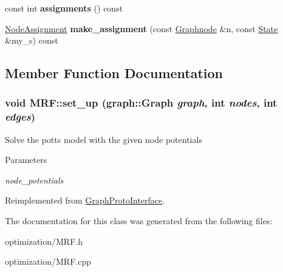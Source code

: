 \begin{DoxyCompactItemize}
\item 
\hypertarget{class_m_r_f_aaf17c4a671ea4f06553c33fca90bfa35}{
const int {\bfseries assignments} () const }
\label{class_m_r_f_aaf17c4a671ea4f06553c33fca90bfa35}

\item 
\hypertarget{class_m_r_f_a9326b3fd5aea915a1bb8a1ad2ac50f3f}{
\hyperlink{struct_node_assignment}{NodeAssignment} {\bfseries make\_\-assignment} (const \hyperlink{class_scarab_1_1_graph_1_1_graphnode}{Graphnode} \&n, const \hyperlink{struct_state}{State} \&my\_\-s) const }
\label{class_m_r_f_a9326b3fd5aea915a1bb8a1ad2ac50f3f}

\end{DoxyCompactItemize}


\subsection{Member Function Documentation}
\hypertarget{class_m_r_f_a928f19f948fa97796462fd9542a985fd}{
\subsubsection[{set\_\-up}]{\setlength{\rightskip}{0pt plus 5cm}void MRF::set\_\-up (graph::Graph {\em graph}, \/  int {\em nodes}, \/  int {\em edges})}}
\label{class_m_r_f_a928f19f948fa97796462fd9542a985fd}
Solve the potts model with the given node potentials


\begin{DoxyParams}{Parameters}
\item[{\em node\_\-potentials}]\end{DoxyParams}


Reimplemented from \hyperlink{class_graph_proto_interface}{GraphProtoInterface}.



The documentation for this class was generated from the following files:\begin{DoxyCompactItemize}
\item 
optimization/MRF.h\item 
optimization/MRF.cpp\end{DoxyCompactItemize}
